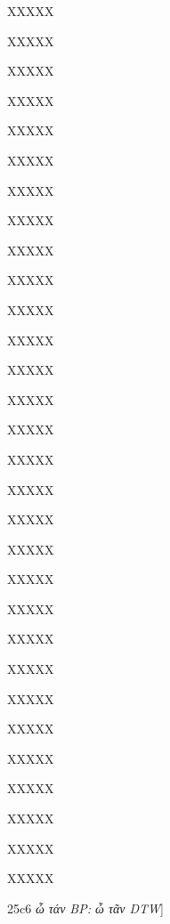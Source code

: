 \documentclass[11pt,a4paper]{book}
\begin{document}
\begin{greek}
\numberpstarttrue
\resumenumbering

\pstart{}XXXXX\pend

\pstart{}XXXXX\pend

\pstart{}XXXXX\pend

\pstart{}XXXXX\pend

\pstart{}XXXXX\pend

\pstart{}XXXXX\pend

\pstart{}XXXXX\pend

\pstart{}XXXXX\pend

\pstart{}XXXXX\pend

\pstart{}XXXXX\pend

\pstart{}XXXXX\pend

\pstart{}XXXXX\pend

\pstart{}XXXXX\pend

\pstart{}XXXXX\pend

\pstart{}XXXXX\pend

\pstart{}XXXXX\pend

\pstart{}XXXXX\pend

\pstart{}XXXXX\pend

\pstart{}XXXXX\pend

\pstart{}XXXXX\pend

\pstart{}XXXXX\pend

\pstart{}XXXXX\pend

\pstart{}XXXXX\pend

\pstart{}XXXXX\pend

\pstart{}XXXXX\pend

\pstart{}XXXXX\pend

\pstart{}XXXXX\pend

\pstart{}XXXXX\pend

\pstart{}XXXXX\pend

\pstart{}XXXXX\pend

\pstart
25c6 \textit{ὦ τάν BP: ὦ τᾶν DTW}] %
\pend

\pausenumbering


\end{greek}
\end{document}
